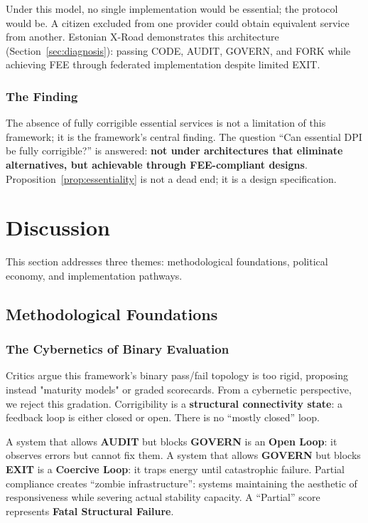 \documentclass{article}
\begin{document}
Under this model, no single implementation would be essential; the protocol would be. A citizen excluded from one provider could obtain equivalent service from another. Estonian X-Road demonstrates this architecture (Section~\ref{sec:diagnosis}): passing CODE, AUDIT, GOVERN, and FORK while achieving FEE through federated implementation despite limited EXIT.

\subsubsection{The Finding}

The absence of fully corrigible essential services is not a limitation of this framework; it is the framework's central finding. The question ``Can essential DPI be fully corrigible?'' is answered: \textbf{not under architectures that eliminate alternatives, but achievable through FEE-compliant designs}. Proposition~\ref{prop:essentiality} is not a dead end; it is a design specification.

\section{Discussion}
\label{sec:discussion}

This section addresses three themes: methodological foundations, political economy, and implementation pathways.

\subsection{Methodological Foundations}
\label{subsec:methodology}

\subsubsection{The Cybernetics of Binary Evaluation}

Critics argue this framework's binary pass/fail topology is too rigid, proposing instead "maturity models" or graded scorecards. From a cybernetic perspective, we reject this gradation. Corrigibility is a \textbf{structural connectivity state}: a feedback loop is either closed or open. There is no ``mostly closed'' loop.

A system that allows \textbf{AUDIT} but blocks \textbf{GOVERN} is an \textbf{Open Loop}: it observes errors but cannot fix them. A system that allows \textbf{GOVERN} but blocks \textbf{EXIT} is a \textbf{Coercive Loop}: it traps energy until catastrophic failure. Partial compliance creates ``zombie infrastructure'': systems maintaining the aesthetic of responsiveness while severing actual stability capacity. A ``Partial'' score represents \textbf{Fatal Structural Failure}.
\end{document}
